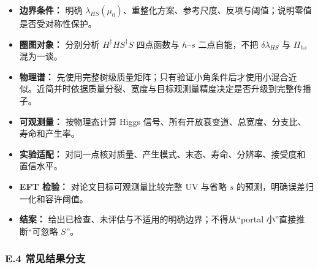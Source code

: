 \documentclass[
]{article}
\providecommand{\tightlist}{%
  \setlength{\itemsep}{0pt}\setlength{\parskip}{0pt}}
\begin{document}
\begin{itemize}
\tightlist
\item[$\square$]
  \textbf{边界条件：} 明确
  \(\lambda_{HS}(\mu_0)\)、重整化方案、参考尺度、反项与阈值；说明零值是否受对称性保护。
\item[$\square$]
  \textbf{圈图对象：} 分别分析 \(H^\dagger H S^\dagger S\) 四点函数与
  \(h\)--\(s\) 二点自能，不把 \(\delta\lambda_{HS}\) 与 \(\Pi_{hs}\)
  混为一谈。
\item[$\square$]
  \textbf{物理谱：}
  先使用完整树级质量矩阵；只有验证小角条件后才使用小混合近似。近简并时依据质量分裂、宽度与目标观测量精度决定是否升级到完整传播子。
\item[$\square$]
  \textbf{可观测量：} 按物理态计算 Higgs
  信号、所有开放衰变道、总宽度、分支比、寿命和产生率。
\item[$\square$]
  \textbf{实验适配：}
  对同一点核对质量、产生模式、末态、寿命、分辨率、接受度和置信水平。
\item[$\square$]
  \textbf{EFT 检验：} 对论文目标可观测量比较完整 UV 与省略 \(s\)
  的预测，明确误差归一化和容许阈值。
\item[$\square$]
  \textbf{结案：} 给出已检查、未评估与不适用的明确边界；不得从``portal
  小''直接推断``可忽略 \(S\)''。
\end{itemize}

\subsubsection{E.4
常见结果分支}\label{e.4-ux5e38ux89c1ux7ed3ux679cux5206ux652f}
\end{document}
